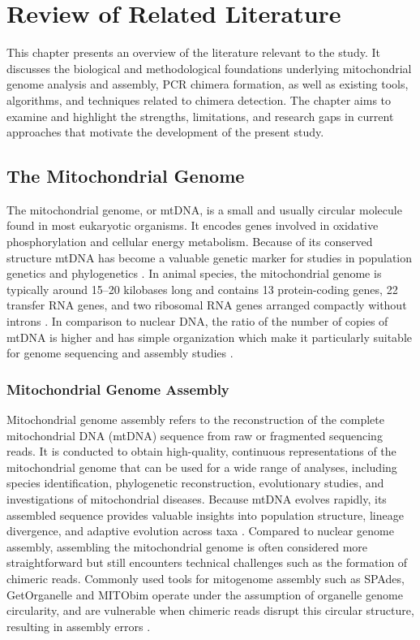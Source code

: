 \chapter{Review of Related Literature}
This chapter presents an overview of the literature relevant to the study. It discusses the biological and methodological foundations underlying mitochondrial genome analysis and assembly, PCR chimera formation, as well as existing tools, algorithms, and techniques related to chimera detection. The chapter aims to examine and highlight the strengths, limitations, and research gaps in current approaches that motivate the development of the present study.

\section{The Mitochondrial Genome}
The mitochondrial genome, or mtDNA, is a small and usually circular molecule found in most eukaryotic organisms. It encodes genes involved in oxidative phosphorylation and cellular energy metabolism. Because of its conserved structure mtDNA has become a valuable genetic marker for studies in population genetics and phylogenetics \citep{Anderson1981,Boore1999}. 
In animal species, the mitochondrial genome is typically around 15–20 kilobases long and contains 13 protein-coding genes, 22 transfer RNA genes, and two ribosomal RNA genes arranged compactly without introns \citep{Gray1999}. In comparison to nuclear DNA, the ratio of the number of copies of mtDNA is higher and has simple organization which make it particularly suitable for genome sequencing and assembly studies \citep{Dierckxsens2017}. 

\subsection {Mitochondrial Genome Assembly}
Mitochondrial genome assembly refers to the reconstruction of the complete mitochondrial DNA (mtDNA) sequence from raw or fragmented sequencing reads. It is conducted to obtain high-quality, continuous representations of the mitochondrial genome that can be used for a wide range of analyses, including species identification, phylogenetic reconstruction, evolutionary studies, and investigations of mitochondrial diseases. Because mtDNA evolves rapidly, its assembled sequence provides valuable insights into population structure, lineage divergence, and adaptive evolution across taxa \citep{Boore1999}. Compared to nuclear genome assembly, assembling the mitochondrial genome is often considered more straightforward but still encounters technical challenges such as the formation of chimeric reads. Commonly used tools for mitogenome assembly such as SPAdes, GetOrganelle and MITObim operate under the assumption of organelle genome circularity, and are vulnerable when chimeric reads disrupt this circular structure, resulting in assembly errors \citep{Jin2020, Hahn2013}.

